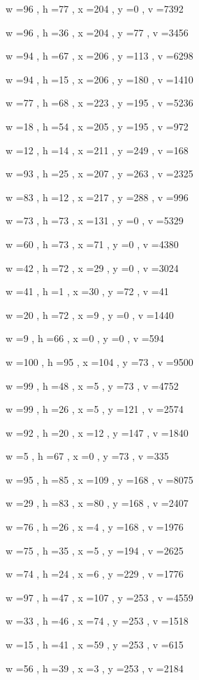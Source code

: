 \documentclass[11pt]{article}
\begin{document}
w =96 , h =77 , x =204 , y =0 , v =7392
\par
w =96 , h =36 , x =204 , y =77 , v =3456
\par
w =94 , h =67 , x =206 , y =113 , v =6298
\par
w =94 , h =15 , x =206 , y =180 , v =1410
\par
w =77 , h =68 , x =223 , y =195 , v =5236
\par
w =18 , h =54 , x =205 , y =195 , v =972
\par
w =12 , h =14 , x =211 , y =249 , v =168
\par
w =93 , h =25 , x =207 , y =263 , v =2325
\par
w =83 , h =12 , x =217 , y =288 , v =996
\par
w =73 , h =73 , x =131 , y =0 , v =5329
\par
w =60 , h =73 , x =71 , y =0 , v =4380
\par
w =42 , h =72 , x =29 , y =0 , v =3024
\par
w =41 , h =1 , x =30 , y =72 , v =41
\par
w =20 , h =72 , x =9 , y =0 , v =1440
\par
w =9 , h =66 , x =0 , y =0 , v =594
\par
w =100 , h =95 , x =104 , y =73 , v =9500
\par
w =99 , h =48 , x =5 , y =73 , v =4752
\par
w =99 , h =26 , x =5 , y =121 , v =2574
\par
w =92 , h =20 , x =12 , y =147 , v =1840
\par
w =5 , h =67 , x =0 , y =73 , v =335
\par
w =95 , h =85 , x =109 , y =168 , v =8075
\par
w =29 , h =83 , x =80 , y =168 , v =2407
\par
w =76 , h =26 , x =4 , y =168 , v =1976
\par
w =75 , h =35 , x =5 , y =194 , v =2625
\par
w =74 , h =24 , x =6 , y =229 , v =1776
\par
w =97 , h =47 , x =107 , y =253 , v =4559
\par
w =33 , h =46 , x =74 , y =253 , v =1518
\par
w =15 , h =41 , x =59 , y =253 , v =615
\par
w =56 , h =39 , x =3 , y =253 , v =2184
\par
\newpage
\end{document}
